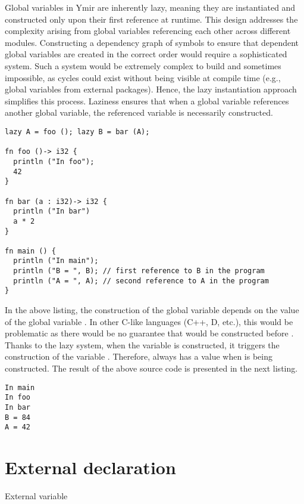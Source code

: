 Global variables in Ymir are inherently lazy, meaning they are instantiated and
constructed only upon their first reference at runtime. This design addresses
the complexity arising from global variables referencing each other across
different modules. Constructing a dependency graph of symbols to ensure that
dependent global variables are created in the correct order would require a
sophisticated system. Such a system would be extremely complex to build and
sometimes impossible, as cycles could exist without being visible at compile
time (e.g., global variables from external packages). Hence, the lazy
instantiation approach simplifies this process. Laziness ensures that when a
global variable references another global variable, the referenced variable is
necessarily constructed.

\begin{lstlisting}[style=coloredverbatim]
lazy A = foo (); lazy B = bar (A);

fn foo ()-> i32 {
  println ("In foo");
  42
}

fn bar (a : i32)-> i32 {
  println ("In bar")
  a * 2
}

fn main () {
  println ("In main");
  println ("B = ", B); // first reference to B in the program
  println ("A = ", A); // second reference to A in the program
}
\end{lstlisting}

In the above listing, the construction of the global variable  depends
on the value of the global variable . In other C-like languages (C++,
D, etc.), this would be problematic as there would be no guarantee that
 would be constructed before . Thanks to the lazy system, when
the variable  is constructed, it triggers the construction of the
variable . Therefore,  always has a value when  is
being constructed. The result of the above source code is presented in the next
listing.

\begin{lstlisting}[style=intermediateVerb]
In main
In foo
In bar
B = 84
A = 42
\end{lstlisting}

\vfill%
\pagebreak

\section{External declaration}%
\label{sec:extern_var}

External variable
